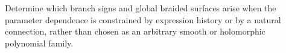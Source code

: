 \begin{problem}
\label{prob:natural-fillings}
Determine which branch signs and global braided surfaces arise when the parameter
dependence is constrained by expression history or by a natural connection, rather
than chosen as an arbitrary smooth or holomorphic polynomial family.
\end{problem}
